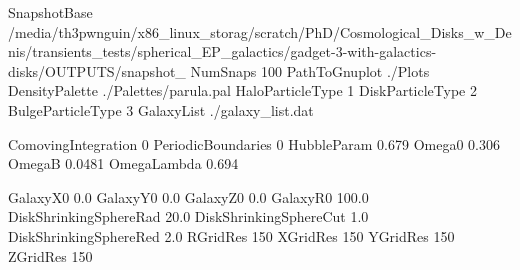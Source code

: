 %
%



SnapshotBase     /media/th3pwnguin/x86_linux_storag/scratch/PhD/Cosmological_Disks_w_Denis/transients_tests/spherical_EP_galactics/gadget-3-with-galactics-disks/OUTPUTS/snapshot_
NumSnaps           100
PathToGnuplot      ./Plots
DensityPalette     ./Palettes/parula.pal
HaloParticleType   1
DiskParticleType   2
BulgeParticleType  3
GalaxyList         ./galaxy_list.dat


ComovingIntegration    0
PeriodicBoundaries     0
HubbleParam            0.679
Omega0                 0.306
OmegaB                 0.0481
OmegaLambda            0.694


GalaxyX0                0.0
GalaxyY0                0.0
GalaxyZ0                0.0
GalaxyR0                100.0
DiskShrinkingSphereRad  20.0
DiskShrinkingSphereCut  1.0
DiskShrinkingSphereRed  2.0
RGridRes                150
XGridRes                150
YGridRes                150
ZGridRes                150
